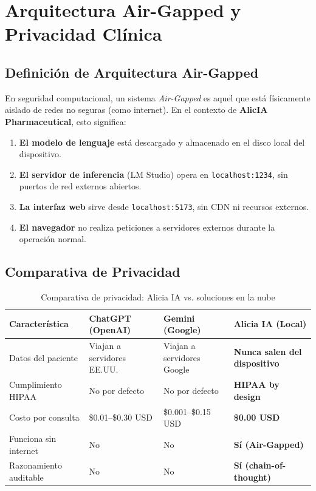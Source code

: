 \documentclass[12pt,a4paper]{article}
\begin{document}
\newpage

\section{Arquitectura Air-Gapped y Privacidad Clínica}

\subsection{Definición de Arquitectura Air-Gapped}

En seguridad computacional, un sistema \textit{Air-Gapped} es aquel que está físicamente
aislado de redes no seguras (como internet). En el contexto de \textbf{AlicIA Pharmaceutical},
esto significa:

\begin{enumerate}
  \item \textbf{El modelo de lenguaje} está descargado y almacenado en el disco local del
    dispositivo.
  \item \textbf{El servidor de inferencia} (LM Studio) opera en \texttt{localhost:1234}, sin
    puertos de red externos abiertos.
  \item \textbf{La interfaz web} sirve desde \texttt{localhost:5173}, sin CDN ni recursos externos.
  \item \textbf{El navegador} no realiza peticiones a servidores externos durante la operación normal.
\end{enumerate}

\subsection{Comparativa de Privacidad}

\begin{table}[H]
  \centering
  \caption{Comparativa de privacidad: Alicia IA vs. soluciones en la nube}
  \begin{tabularx}{\textwidth}{lXXX}
    \toprule
    \textbf{Característica} & \textbf{ChatGPT (OpenAI)} & \textbf{Gemini (Google)} & \textbf{Alicia IA (Local)} \\
    \midrule
    Datos del paciente & Viajan a servidores EE.UU. & Viajan a servidores Google & \textbf{Nunca salen del dispositivo} \\
    \midrule
    Cumplimiento HIPAA & No por defecto & No por defecto & \textbf{HIPAA by design} \\
    \midrule
    Costo por consulta & \$0.01--\$0.30 USD & \$0.001--\$0.15 USD & \textbf{\$0.00 USD} \\
    \midrule
    Funciona sin internet & No & No & \textbf{Sí (Air-Gapped)} \\
    \midrule
    Razonamiento auditable & No & No & \textbf{Sí (chain-of-thought)} \\
    \bottomrule
  \end{tabularx}
\end{table}
\end{document}
